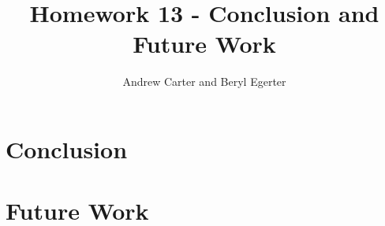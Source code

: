 \documentclass{article}
\title{Homework 13 - Conclusion and Future Work}
\author{Andrew Carter and Beryl Egerter}
\begin{document}
\maketitle
\section{Conclusion}

\section{Future Work}
\end{document}
